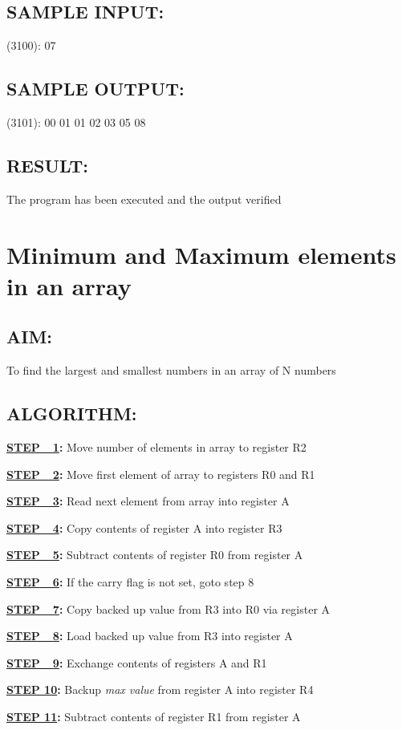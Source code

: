\documentclass[a4paper,28pt]{report}
\begin{document}
\section*{SAMPLE INPUT:}
(3100): 07
\section*{SAMPLE OUTPUT:}
(3101): 00 01 01 02 03 05 08
\section*{RESULT:}
The program has been executed and the output verified
%
%
%
\chapter{Minimum and Maximum elements in an array}
%
%
\section*{AIM:}To find the largest and smallest numbers in an array of N numbers

\section*{ALGORITHM:}
\textbf{\underline{STEP\ \ 1}:} Move number of elements in array to register R2

\textbf{\underline{STEP\ \ 2}:} Move first element of array to registers R0 and R1

\textbf{\underline{STEP\ \ 3}:} Read next element from array into register A

\textbf{\underline{STEP\ \ 4}:} Copy contents of register A into register R3

\textbf{\underline{STEP\ \ 5}:} Subtract contents of register R0 from register A

\textbf{\underline{STEP\ \ 6}:} If the carry flag is not set, goto step 8

\textbf{\underline{STEP\ \ 7}:} Copy backed up value from R3 into R0 via register A

\textbf{\underline{STEP\ \ 8}:} Load backed up value from R3 into register A

\textbf{\underline{STEP\ \ 9}:} Exchange contents of registers A and R1

\textbf{\underline{STEP 10}:} Backup \emph{max value} from register A into register R4

\textbf{\underline{STEP 11}:} Subtract contents of register R1 from register A
\end{document}
